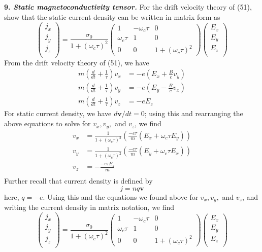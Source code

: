 \documentclass{article}
\begin{document}
\textbf{9. \textit{Static magnetoconductivity tensor.}} For the drift velocity theory of (51), show that the static current density can be written in matrix form as 
\[\begin{pmatrix}
    j_x \\
    j_y \\
    j_z \\
\end{pmatrix}
 = \frac{\sigma_0}{1 + (\omega_c\tau)^2}\begin{pmatrix}
    1 & -\omega_c\tau & 0 \\
    \omega_c\tau & 1 & 0 \\
    0 & 0 & 1 + (\omega_c\tau)^2
 \end{pmatrix}
 \begin{pmatrix}
    E_x \\
    E_y \\
    E_z \\
 \end{pmatrix}\]
From the drift velocity theory of (51), we have
\begin{align*}
    m\left(\frac{d}{dt} + \frac{1}{\tau}\right)v_x &= -e\left(E_x + \frac{B}{c}v_y\right) \\
    m\left(\frac{d}{dt} + \frac{1}{\tau}\right)v_y &= -e\left(E_y - \frac{B}{c}v_x\right) \\
    m\left(\frac{d}{dt} + \frac{1}{\tau}\right)v_z &= -eE_z
\end{align*}
For static current density, we have $d\textbf{v}/dt = 0$; using this and rearranging the above equations to solve for $v_x, v_y,$ and $v_z$, we find
\begin{align*}
    v_x &= \frac{1}{1 + (\omega_c\tau)^2}\left(\frac{-e\tau}{m}(E_x + \omega_c\tau E_y)\right) \\
    v_y &= \frac{1}{1 + (\omega_c\tau)^2}\left(\frac{-e\tau}{m}(E_y + \omega_c\tau E_x)\right) \\
    v_z &= -\frac{-e\tau E_z}{m} \\
\end{align*}
Further recall that current density is defined by
\[j = nq\textbf{v}\]
here, $q = -e$. Using this and the equations we found above for $v_x, v_y, $ and $v_z$, and writing the current density in matrix notation, we find
\[\begin{pmatrix}
    j_x \\
    j_y \\
    j_z \\
\end{pmatrix}
= \frac{\sigma_0}{1 + (\omega_c\tau)^2}\begin{pmatrix}
    1 & -\omega_c\tau & 0 \\
    \omega_c\tau & 1 & 0 \\
    0 & 0 & 1 + (\omega_c\tau)^2
\end{pmatrix}
\begin{pmatrix}
    E_x \\
    E_y \\
    E_z \\
\end{pmatrix}
\]
\end{document}
